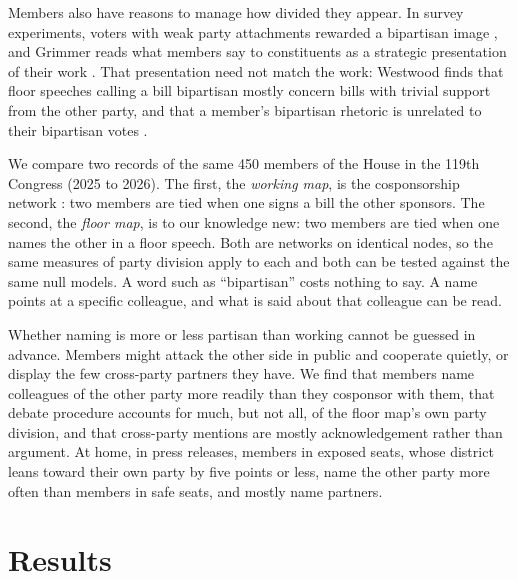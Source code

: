 \documentclass[9pt,twocolumn,twoside]{pnas-new}
\begin{document}
Members also have reasons to manage how divided they appear. In survey experiments, voters with weak party
attachments rewarded a bipartisan image \cite{harbridge2011}, and Grimmer reads what members say to constituents as a
strategic presentation of their work \cite{grimmer2013}. That presentation need not match the work: Westwood finds
that floor speeches calling a bill bipartisan mostly concern bills with trivial support from the other party, and
that a member's bipartisan rhetoric is unrelated to their bipartisan votes \cite{westwood2022}.

We compare two records of the same 450 members of the House in the 119th Congress (2025 to 2026). The first, the \emph{working map}, is the cosponsorship network \cite{fowler2006}: two members are tied when one
signs a bill the other sponsors. The second, the \emph{floor map}, is to our knowledge new: two members are tied when
one names the other in a floor speech. Both are networks on
identical nodes, so the same measures of party division apply to each and both can be tested against the same
null models. A word such as ``bipartisan'' costs nothing to say. A name points at a specific colleague, and what is
said about that colleague can be read.

Whether naming is more or less partisan than working cannot be guessed in advance. Members might attack the other
side in public and cooperate quietly, or display the few cross-party partners they have. We find that members name colleagues of the other party more readily than they cosponsor with them, that debate procedure accounts for much, but not all, of the\Parasplit
floor map's own party division, and that cross-party mentions are mostly acknowledgement rather than
argument. At home, in press releases, members
in exposed seats, whose district leans toward their own party by five points or less, name the other party more often
than members in safe seats, and mostly name partners.

\section*{Results}
\end{document}
